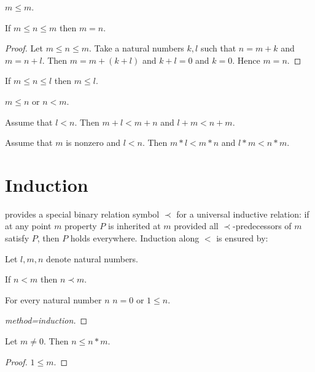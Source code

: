 \documentclass[english,11pt]{article}
\begin{document}
\begin{forthel}

\begin{lemma}
$m \leq m$.
\end{lemma}

\begin{lemma}
If $m \leq n \leq m$ then $m = n$.
\end{lemma}
\begin{proof}
Let $m \leq n \leq m$.
Take a natural numbers $k,l$ such that
$n = m + k$ and $m = n + l$.
Then $m = m + (k + l)$ and $k + l = 0$ and $k = 0$.
Hence $m = n$.
\end{proof}

\begin{lemma}
If $m \leq n \leq l$ then  $m \leq l$.
\end{lemma}

\begin{axiom}
$m \leq n$ or $n < m$.
\end{axiom}

\begin{lemma}
Assume that $l < n$.
Then $m + l < m + n$ and $l + m < n + m$.
\end{lemma}

\begin{lemma}
Assume that $m$ is nonzero and $l < n$.
Then $m * l < m * n$ and $l * m < n * m$.
\end{lemma}

\end{forthel}


\section{Induction}

\Naproche provides a special binary relation
symbol $\prec$ for a universal inductive relation: if at any
point $m$ property $P$ is inherited at $m$ provided all
$\prec$-predecessors of $m$ satisfy $P$, then $P$ holds everywhere.
Induction along $<$ is ensured by:

\begin{forthel}
Let $l,m,n$ denote natural numbers.

\begin{axiom}
If $n < m$ then $n \prec m$.
\end{axiom}

\begin{lemma}
For every natural number $n$ $n = 0$ or $1 \leq n$.
\end{lemma}
\begin{proof}[method=induction]
\end{proof}

\begin{lemma}
Let $m \neq 0$. Then $n \leq n * m$.
\end{lemma}
\begin{proof}
$1 \leq m$.
\end{proof}

\end{forthel}
\end{document}
